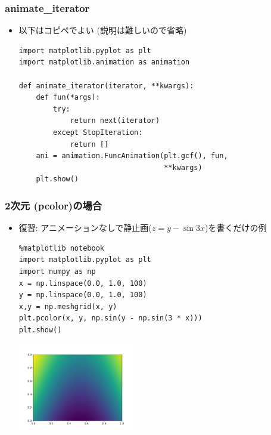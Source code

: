 \documentclass[10pt,dvipdfmx]{beamer}
\begin{document}
\begin{frame}[fragile]
  \frametitle{animate\_iterator}
  \begin{itemize}
  \item 以下はコピペでよい (説明は難しいので省略)
\begin{lstlisting}
import matplotlib.pyplot as plt
import matplotlib.animation as animation

def animate_iterator(iterator, **kwargs):
    def fun(*args):
        try:
            return next(iterator)
        except StopIteration:
            return []
    ani = animation.FuncAnimation(plt.gcf(), fun,
                                  **kwargs)
    plt.show()
\end{lstlisting}
  \end{itemize}
\end{frame}

\begin{frame}[fragile]
  \frametitle{2次元 (pcolor)の場合}
  \begin{itemize}
  \item 復習: アニメーションなしで静止画($z = y - \sin 3x$)を書くだけの例
    
\begin{lstlisting}
%matplotlib notebook
import matplotlib.pyplot as plt
import numpy as np
x = np.linspace(0.0, 1.0, 100)
y = np.linspace(0.0, 1.0, 100)
x,y = np.meshgrid(x, y)
plt.pcolor(x, y, np.sin(y - np.sin(3 * x)))
plt.show()      
\end{lstlisting}

\begin{center}
\includegraphics[width=0.4\textwidth]{out/pdf/svg/z_sinkx.pdf}
\end{center}

  \end{itemize}
\end{frame}
\end{document}
